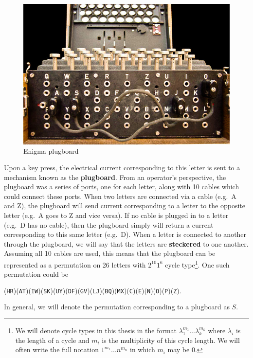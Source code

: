 \begin{figure}[htbp]
  \begin{center}\includegraphics[scale=1.2]{paper/images/plugboard.jpg}
  \end{center}
  \label{ref:plugboard}
  \caption{Enigma plugboard~\cite{enigma_plugboard_wikipedia}}
\end{figure}
\noindent Upon a key press, the electrical current corresponding to this letter
is sent to a mechanism known as the {\bf{plugboard}}. From an operator's
perspective, the plugboard was a series of ports, one for each
letter, along with 10 cables which could connect these ports. When
two letters are connected via a cable (e.g.\ A and Z), the plugboard
will send current corresponding to a letter to the opposite letter
(e.g.\ A goes to Z and vice versa). If no cable is plugged in to a
letter (e.g.\ D has no cable), then the plugboard simply will return a
current corresponding to this same letter (e.g.\ D). When a letter is
connected to another
through the plugboard, we will say that the letters are
{\bf{steckered}} to one another. Assuming all 10
cables are used, this means that the plugboard can be represented as a
permutation on 26 letters with $2^{10}1^6$ cycle type\footnote{We
  will denote cycle types in this thesis in the format
  $\lambda_1^{m_1}\dots\lambda_k^{m_k}$ where $\lambda_i$ is the length
  of a cycle and $m_i$ is the multiplicity of this cycle length. We
  will often write the full notation $1^{m_1}\dots n^{m_n}$ in which
$m_i$ may be $0$.}. One such
permutation could be
\begin{center}
  (\texttt{HR})(\texttt{AT})(\texttt{IW})(\texttt{SK})(\texttt{UY})(\texttt{DF})(\texttt{GV})(\texttt{LJ})(\texttt{BQ})(\texttt{MX})(\texttt{C})(\texttt{E})(\texttt{N})(\texttt{O})(\texttt{P})(\texttt{Z}).
\end{center}
In general, we will denote the permutation corresponding to a plugboard as $S$.

